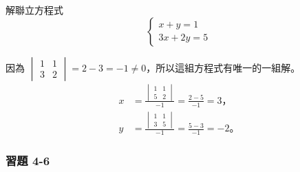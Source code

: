 \begin{example}\label{ex:4-4-2}
解聯立方程式
\begin{equation*}
\begin{cases}
  x+y = 1 \\
  3x+2y = 5
\end{cases}
\end{equation*}
\end{example}

\begin{solution*}
因為 $\begin{vmatrix} 1 & 1 \\ 3 & 2 \end{vmatrix} = 2 - 3 = -1 \neq 0$，所以這組方程式有唯一的一組解。
\begin{align*}
  x &= \frac{\begin{vmatrix} 1 & 1 \\ 5 & 2 \end{vmatrix}}{-1} = \frac{2-5}{-1} = 3 \text{，} \\
  y &= \frac{\begin{vmatrix} 1 & 1 \\ 3 & 5 \end{vmatrix}}{-1} = \frac{5-3}{-1} = -2 \text{。}
\end{align*}
\end{solution*}

\subsubsection*{習題 4-6}\label{sec:ex4-6}

